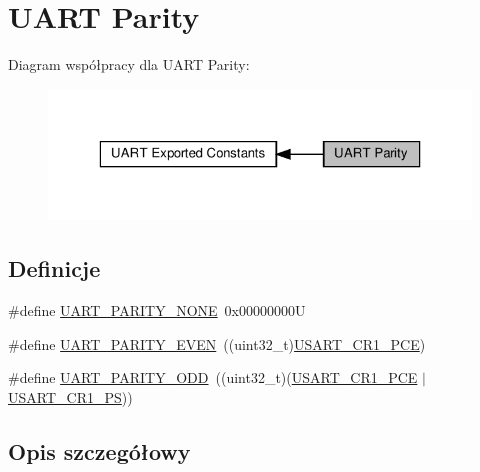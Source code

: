 \hypertarget{group___u_a_r_t___parity}{}\section{U\+A\+RT Parity}
\label{group___u_a_r_t___parity}
Diagram współpracy dla U\+A\+RT Parity\+:\nopagebreak
\begin{figure}[H]
\begin{center}
\leavevmode
\includegraphics[width=323pt]{group___u_a_r_t___parity}
\end{center}
\end{figure}
\subsection*{Definicje}
\begin{DoxyCompactItemize}
\item 
\#define \hyperlink{group___u_a_r_t___parity_ga270dea6e1a92dd83fe58802450bdd60c}{U\+A\+R\+T\+\_\+\+P\+A\+R\+I\+T\+Y\+\_\+\+N\+O\+NE}~0x00000000U
\item 
\#define \hyperlink{group___u_a_r_t___parity_ga063b14ac42ef9e8f4246c17a586b14eb}{U\+A\+R\+T\+\_\+\+P\+A\+R\+I\+T\+Y\+\_\+\+E\+V\+EN}~((uint32\+\_\+t)\hyperlink{group___peripheral___registers___bits___definition_ga60f8fcf084f9a8514efafb617c70b074}{U\+S\+A\+R\+T\+\_\+\+C\+R1\+\_\+\+P\+CE})
\item 
\#define \hyperlink{group___u_a_r_t___parity_ga229615e64964f68f7a856ea6ffea359e}{U\+A\+R\+T\+\_\+\+P\+A\+R\+I\+T\+Y\+\_\+\+O\+DD}~((uint32\+\_\+t)(\hyperlink{group___peripheral___registers___bits___definition_ga60f8fcf084f9a8514efafb617c70b074}{U\+S\+A\+R\+T\+\_\+\+C\+R1\+\_\+\+P\+CE} $\vert$ \hyperlink{group___peripheral___registers___bits___definition_ga2e159d36ab2c93a2c1942df60e9eebbe}{U\+S\+A\+R\+T\+\_\+\+C\+R1\+\_\+\+PS}))
\end{DoxyCompactItemize}


\subsection{Opis szczegółowy}


